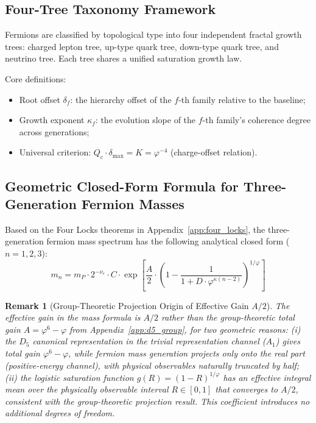 \documentclass[12pt,a4paper,twocolumn]{article}
\renewcommand{\phi}{\varphi}
\newtheorem{remark}[theorem]{Remark}
\begin{document}
\subsection{Four-Tree Taxonomy Framework}
Fermions are classified by topological type into four independent fractal growth trees: charged lepton tree, up-type quark tree, down-type quark tree, and neutrino tree. Each tree shares a unified saturation growth law.

Core definitions:
\begin{itemize}
\item Root offset $\delta_f$: the hierarchy offset of the $f$-th family relative to the baseline;
\item Growth exponent $\kappa_f$: the evolution slope of the $f$-th family's coherence degree across generations;
\item Universal criterion: $Q_c \cdot \delta_{\max} = K = \phi^{-4}$ (charge-offset relation).
\end{itemize}

\subsection{Geometric Closed-Form Formula for Three-Generation Fermion Masses}
Based on the Four Locks theorems in Appendix~\ref{app:four_locks}, the three-generation fermion mass spectrum has the following analytical closed form ($n=1,2,3$):
\[
m_n = m_P \cdot 2^{-\nu_e} \cdot C \cdot \exp\left[ \frac{A}{2} \cdot \left( 1 - \frac{1}{1 + D\cdot\phi^{\kappa(n-2)}} \right)^{1/\phi} \right]
\]

\begin{remark}[Group-Theoretic Projection Origin of Effective Gain $A/2$]
The effective gain in the mass formula is $A/2$ rather than the group-theoretic total gain $A=\phi^6-\phi$ from Appendix~\ref{app:d5_group}, for two geometric reasons: (i) the $D_5$ canonical representation in the trivial representation channel ($A_1$) gives total gain $\phi^6-\phi$, while fermion mass generation projects only onto the real part (positive-energy channel), with physical observables naturally truncated by half; (ii) the logistic saturation function $g(R)=(1-R)^{1/\phi}$ has an effective integral mean over the physically observable interval $R\in[0,1]$ that converges to $A/2$, consistent with the group-theoretic projection result. This coefficient introduces no additional degrees of freedom.
\end{remark}
\end{document}
